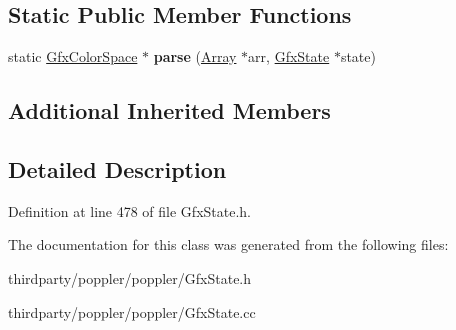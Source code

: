 \subsection*{Static Public Member Functions}
\begin{DoxyCompactItemize}
\item 
\mbox{\label{class_gfx_lab_color_space_a1abc7f1c31cb4896fd9c92bbd42d5782}} 
static \hyperlink{class_gfx_color_space}{Gfx\+Color\+Space} $\ast$ {\bfseries parse} (\hyperlink{class_array}{Array} $\ast$arr, \hyperlink{class_gfx_state}{Gfx\+State} $\ast$state)
\end{DoxyCompactItemize}
\subsection*{Additional Inherited Members}


\subsection{Detailed Description}


Definition at line 478 of file Gfx\+State.\+h.



The documentation for this class was generated from the following files\+:\begin{DoxyCompactItemize}
\item 
thirdparty/poppler/poppler/Gfx\+State.\+h\item 
thirdparty/poppler/poppler/Gfx\+State.\+cc\end{DoxyCompactItemize}

